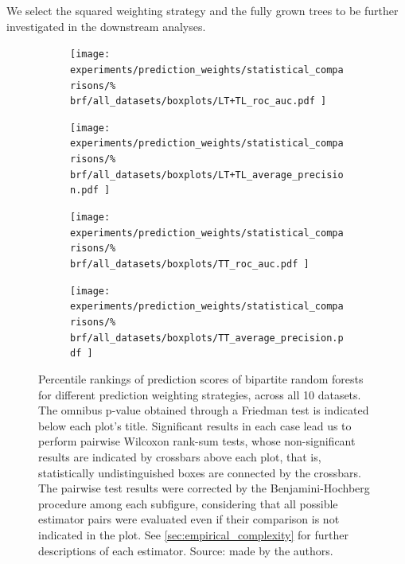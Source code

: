 
We select the squared weighting strategy and the fully grown trees to be further investigated in the downstream analyses. %


\begin{figure}[tbh]
    \centering
    \begin{subfigure}{0.49\textwidth}
        \texttt{[image: 
            experiments/prediction\_weights/statistical\_comparisons/\%
            brf/all\_datasets/boxplots/LT+TL\_roc\_auc.pdf
        ]}
    \end{subfigure}
    \begin{subfigure}{0.49\textwidth}
        \texttt{[image: 
            experiments/prediction\_weights/statistical\_comparisons/\%
            brf/all\_datasets/boxplots/LT+TL\_average\_precision.pdf
        ]}
    \end{subfigure}

    \begin{subfigure}{0.49\textwidth}
        \texttt{[image: 
            experiments/prediction\_weights/statistical\_comparisons/\%
            brf/all\_datasets/boxplots/TT\_roc\_auc.pdf
        ]}
    \end{subfigure}
    \begin{subfigure}{0.49\textwidth}
        \texttt{[image: 
            experiments/prediction\_weights/statistical\_comparisons/\%
            brf/all\_datasets/boxplots/TT\_average\_precision.pdf
        ]}
    \end{subfigure}
    \caption{
        Percentile rankings of prediction scores of bipartite random forests for different prediction weighting strategies, across all 10 datasets.
        The omnibus p-value obtained through a Friedman test is indicated below each plot's title. Significant results in each case lead us to perform pairwise Wilcoxon rank-sum tests, whose non-significant results are indicated by crossbars above each plot, that is, statistically undistinguished boxes are connected by the crossbars. The pairwise test results were corrected by the Benjamini-Hochberg procedure among each subfigure, considering that all possible estimator pairs were evaluated even if their comparison is not indicated in the plot. See \autoref{sec:empirical_complexity} for further descriptions of each estimator. Source: made by the authors.
    }
    \label{fig:pred_weights_brf}
\end{figure}


